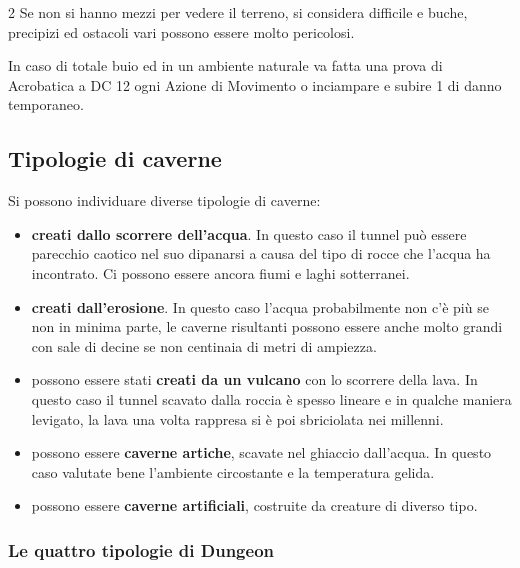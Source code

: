 \begin{multicols}{2}
Se non si hanno mezzi per vedere il terreno, si considera difficile e buche, precipizi ed ostacoli vari possono essere molto pericolosi.

In caso di totale buio ed in un ambiente naturale va fatta una prova di Acrobatica a DC 12 ogni Azione di Movimento o inciampare e subire 1 di danno temporaneo.

\subsection{Tipologie di caverne}

Si possono individuare diverse tipologie di caverne:

\begin{itemize}[leftmargin=*] \setlength{\itemsep}{0pt}

\item \textbf{creati dallo scorrere dell'acqua}. In questo caso il tunnel può essere parecchio caotico nel suo dipanarsi a causa del tipo di rocce che l'acqua ha incontrato. Ci possono essere ancora fiumi e laghi sotterranei.

\item \textbf{creati dall'erosione}. In questo caso l'acqua probabilmente non c'è più se non in minima parte, le caverne risultanti possono essere anche molto grandi con sale di decine se non centinaia di metri di ampiezza.

\item possono essere stati \textbf{creati da un vulcano} con lo scorrere della lava. In questo caso il tunnel scavato dalla roccia è spesso lineare e in qualche maniera levigato, la lava una volta rappresa si è poi sbriciolata nei millenni.

\item possono essere \textbf{caverne artiche}, scavate nel ghiaccio dall'acqua. In questo caso valutate bene l'ambiente circostante e la temperatura gelida.

\item possono essere \textbf{caverne artificiali}, costruite da creature di diverso tipo.

\end{itemize}

\subsubsection{Le quattro tipologie di Dungeon}


\end{multicols}
